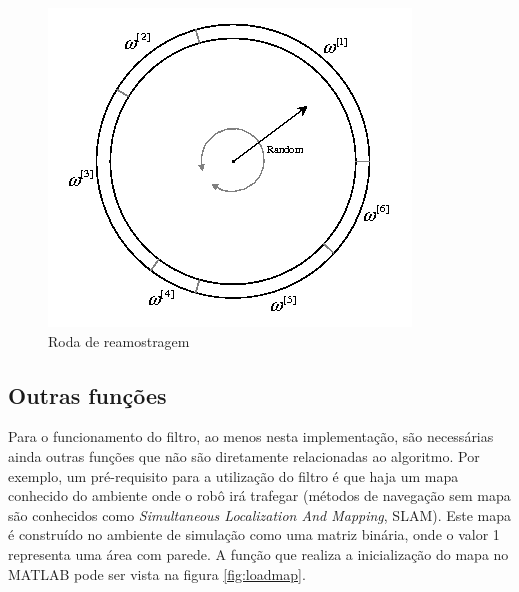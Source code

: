 \documentclass[
	12pt,				%
	openright,			%
	oneside,			%
	a4paper,			%
	english,			%
	french,				%
	spanish,			%
	brazil,				%
	]{abntex2}
\begin{document}
\begin{figure}[h!]
    \centering
    \includegraphics[scale = 0.7]{figs/samplingwheel}
    \caption{Roda de reamostragem}
    \label{fig:samplingwheel}
\end{figure}

\subsection{Outras funções}
\label{subsec:outras_funções}
Para o funcionamento do filtro, ao menos nesta implementação, são necessárias ainda outras funções que não são diretamente relacionadas ao algoritmo. Por exemplo, um pré-requisito para a utilização do filtro é que haja um mapa conhecido do ambiente onde o robô irá trafegar (métodos de navegação sem mapa são conhecidos como \emph{Simultaneous Localization And Mapping}, SLAM). Este mapa é construído no ambiente de simulação como uma matriz binária, onde o valor 1 representa uma área com parede. A função que realiza a inicialização do mapa no MATLAB pode ser vista na figura \ref{fig:loadmap}.
\end{document}
